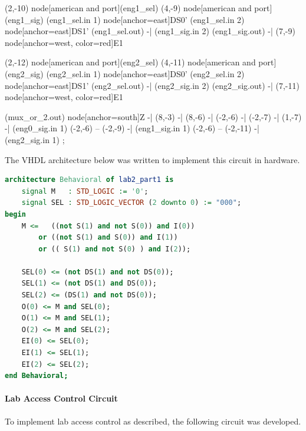 \documentclass{article}
\begin{document}
\begin{circuitikz}[scale=0.75, transform shape]
            (2,-10) node[american and port](eng1_sel){}
            (4,-9)  node[american and port](eng1_sig){}
            (eng1_sel.in 1) node[anchor=east]{DS0'}
            (eng1_sel.in 2) node[anchor=east]{DS1'}
            (eng1_sel.out) -| (eng1_sig.in 2){}
            (eng1_sig.out) -| (7,-9) node[anchor=west, color=red]{E1}

            (2,-12) node[american and port](eng2_sel){}
            (4,-11) node[american and port](eng2_sig){}
            (eng2_sel.in 1) node[anchor=east]{DS0'}
            (eng2_sel.in 2) node[anchor=east]{DS1'}
            (eng2_sel.out) -| (eng2_sig.in 2){}
            (eng2_sig.out) -| (7,-11) node[anchor=west, color=red]{E1}


            (mux_or_2.out) node[anchor=south]{Z} -| (8,-3) -| (8,-6)
            -| (-2,-6) -| (-2,-7) -| (1,-7) -| (eng0_sig.in 1)
            (-2,-6) -- (-2,-9) -| (eng1_sig.in 1)
            (-2,-6) -- (-2,-11) -| (eng2_sig.in 1)
        ;
    \end{circuitikz}

    The VHDL architecture below was written to implement this circuit in hardware.

    \begin{lstlisting}[language=VHDL]
architecture Behavioral of lab2_part1 is
    signal M   : STD_LOGIC := '0';
    signal SEL : STD_LOGIC_VECTOR (2 downto 0) := "000";
begin
    M <=   ((not S(1) and not S(0)) and I(0))
        or ((not S(1) and S(0)) and I(1))
        or (( S(1) and not S(0) ) and I(2));
    
    SEL(0) <= (not DS(1) and not DS(0));
    SEL(1) <= (not DS(1) and DS(0));
    SEL(2) <= (DS(1) and not DS(0)); 
    O(0) <= M and SEL(0);
    O(1) <= M and SEL(1);
    O(2) <= M and SEL(2);
    EI(0) <= SEL(0);
    EI(1) <= SEL(1);
    EI(2) <= SEL(2);
end Behavioral;
    \end{lstlisting}
    \newpage

    \paragraph{Lab Access Control Circuit}
    To implement lab access control as described, the following circuit was developed.
\end{document}
